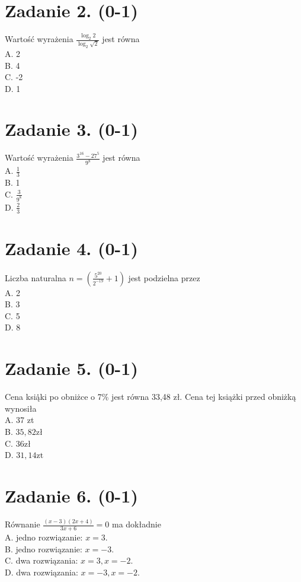 \documentclass[10pt]{article}
\begin{document}
\section*{Zadanie 2. (0-1)}
Wartość wyrażenia \(\frac{\log _{2} 2}{\log _{2} \sqrt{2}}\) jest równa\\
A. 2\\
B. 4\\
C. -2\\
D. 1

\section*{Zadanie 3. (0-1)}
Wartość wyrażenia \(\frac{3^{16}-27^{5}}{9^{8}}\) jest równa\\
A. \(\frac{1}{3}\)\\
B. 1\\
C. \(\frac{3}{9^{8}}\)\\
D. \(\frac{2}{3}\)

\section*{Zadanie 4. (0-1)}
Liczba naturalna \(n=\left(\frac{5^{20}}{2^{-19}}+1\right)\) jest podzielna przez\\
A. 2\\
B. 3\\
C. 5\\
D. 8

\section*{Zadanie 5. (0-1)}
Cena ksią̇̇ki po obniżce o 7\% jest równa 33,48 zł. Cena tej książki przed obniżką wynosiła\\
A. 37 zt\\
B. \(35,82 \mathrm{zł}\)\\
C. \(36 \mathrm{zł}\)\\
D. \(31,14 \mathrm{zt}\)

\section*{Zadanie 6. (0-1)}
Równanie \(\frac{(x-3)(2 x+4)}{3 x+6}=0\) ma dokładnie\\
A. jedno rozwiązanie: \(x=3\).\\
B. jedno rozwiązanie: \(x=-3\).\\
C. dwa rozwiązania: \(x=3, x=-2\).\\
D. dwa rozwiązania: \(x=-3, x=-2\).
\end{document}
